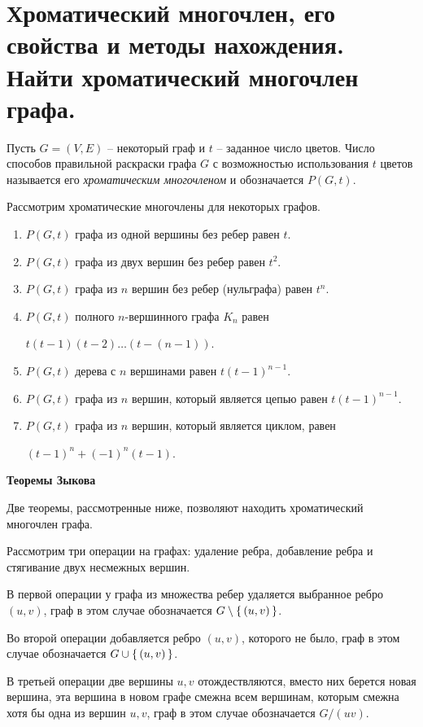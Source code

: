 \section{Хроматический многочлен, его свойства и методы нахождения. Найти хроматический многочлен 
графа.}

\begin{definition}
    Пусть $G=(V,E)$ -- некоторый граф и $t$ -- заданное число цветов.
    Число способов правильной раскраски графа $G$ с возможностью
    использования $t$ цветов называется его \textit{хроматическим многочленом} и
    обозначается $P(G,t)$.
\end{definition}

Рассмотрим хроматические многочлены для некоторых графов.
\begin{enumerate}[left=0.0em, labelsep=1em, topsep=0.0em, itemsep=0pt, parsep=0.5em]
    \item $P(G,t)$ графа из одной вершины без ребер равен $t$.
    \item $P(G,t)$ графа из двух вершин без ребер равен $t^2$.
    \item $P(G,t)$ графа из $n$ вершин без ребер (нульграфа) равен $t^n$.
    \item $P(G,t)$ полного $n$-вершинного графа $K_n$ равен
    
    $t(t-1)(t-2) \dots (t-(n-1))$.
    \item $P(G,t)$ дерева с $n$ вершинами равен $t(t-1)^{n-1}$.
    \item $P(G,t)$ графа из $n$ вершин, который является цепью равен $t(t-1)^{n-1}$.
    \item $P(G,t)$ графа из $n$ вершин, который является циклом, равен
    
    $(t-1)^n +(-1)^n(t-1)$.
\end{enumerate}


\textbf{Теоремы Зыкова}

Две теоремы, рассмотренные ниже, позволяют находить хроматический
многочлен графа.

Рассмотрим три операции на графах: удаление ребра, добавление ребра и
стягивание двух несмежных вершин.

В первой операции у графа из множества ребер удаляется выбранное ребро
$(u, v)$, граф в этом случае обозначается $G \setminus \set{(u, v)}$.

Во второй операции добавляется ребро $(u, v)$, которого не было, граф в этом
случае обозначается $G \cup \set{(u, v)}$.

В третьей операции две вершины $u, v$ отождествляются, вместо них берется
новая вершина, эта вершина в новом графе смежна всем вершинам,
которым смежна хотя бы одна из вершин $u, v$, граф в этом случае
обозначается $G/(uv)$.

